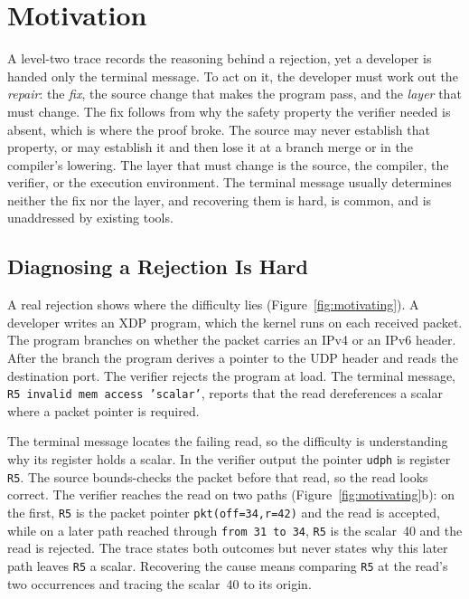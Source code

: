
\section{Motivation}
\label{sec:motivation}

A level-two trace records the reasoning behind a rejection, yet a developer is handed only the terminal message. To act on it, the developer must work out the \emph{repair}: the \emph{fix}, the source change that makes the program pass, and the \emph{layer} that must change. The fix follows from why the safety property the verifier needed is absent, which is where the proof broke. The source may never establish that property, or may establish it and then lose it at a branch merge or in the compiler's lowering. The layer that must change is the source, the compiler, the verifier, or the execution environment. The terminal message usually determines neither the fix nor the layer, and recovering them is hard, is common, and is unaddressed by existing tools.

\subsection{Diagnosing a Rejection Is Hard}
\label{sec:diagnosis}

A real rejection shows where the difficulty lies (Figure~\ref{fig:motivating}). A developer writes an XDP program, which the kernel runs on each received packet. The program branches on whether the packet carries an IPv4 or an IPv6 header. After the branch the program derives a pointer to the UDP header and reads the destination port. The verifier rejects the program at load. The terminal message, \texttt{R5 invalid mem access 'scalar'}, reports that the read dereferences a scalar where a packet pointer is required.

The terminal message locates the failing read, so the difficulty is understanding why its register holds a scalar. In the verifier output the pointer \texttt{udph} is register \texttt{R5}. The source bounds-checks the packet before that read, so the read looks correct. The verifier reaches the read on two paths (Figure~\ref{fig:motivating}b): on the first, \texttt{R5} is the packet pointer \texttt{pkt(off=34,r=42)} and the read is accepted, while on a later path reached through \texttt{from 31 to 34}, \texttt{R5} is the scalar~40 and the read is rejected. The trace states both outcomes but never states why this later path leaves \texttt{R5} a scalar. Recovering the cause means comparing \texttt{R5} at the read's two occurrences and tracing the scalar~40 to its origin.

